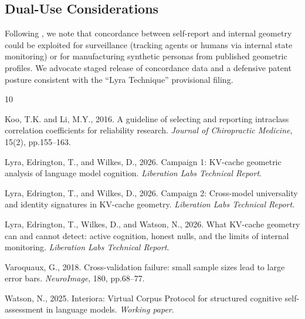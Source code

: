 \documentclass[11pt,a4paper]{article}
\begin{document}
\subsection{Dual-Use Considerations}

Following \citet{watson2025interiora}, we note that concordance between self-report and internal geometry could be exploited for surveillance (tracking agents or humans via internal state monitoring) or for manufacturing synthetic personas from published geometric profiles. We advocate staged release of concordance data and a defensive patent posture consistent with the ``Lyra Technique'' provisional filing.



\begin{thebibliography}{10}

Koo, T.K. and Li, M.Y., 2016. A guideline of selecting and reporting intraclass correlation coefficients for reliability research. \textit{Journal of Chiropractic Medicine}, 15(2), pp.155--163.

Lyra, Edrington, T., and Wilkes, D., 2026. Campaign 1: KV-cache geometric analysis of language model cognition. \textit{Liberation Labs Technical Report}.

Lyra, Edrington, T., and Wilkes, D., 2026. Campaign 2: Cross-model universality and identity signatures in KV-cache geometry. \textit{Liberation Labs Technical Report}.

Lyra, Edrington, T., Wilkes, D., and Watson, N., 2026. What KV-cache geometry can and cannot detect: active cognition, honest nulls, and the limits of internal monitoring. \textit{Liberation Labs Technical Report}.

Varoquaux, G., 2018. Cross-validation failure: small sample sizes lead to large error bars. \textit{NeuroImage}, 180, pp.68--77.

Watson, N., 2025. Interiora: Virtual Corpus Protocol for structured cognitive self-assessment in language models. \textit{Working paper}.

\end{thebibliography}
\end{document}
